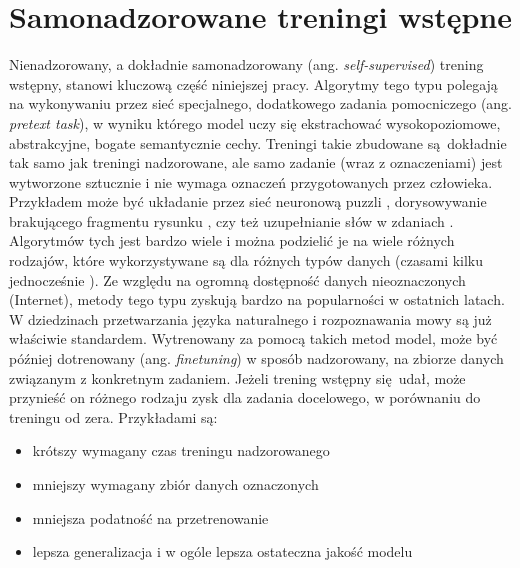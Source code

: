\section{Samonadzorowane treningi wstępne}

Nienadzorowany, a dokładnie samonadzorowany (ang. \emph{self-supervised}) trening wstępny, stanowi
kluczową część niniejszej pracy. Algorytmy tego typu polegają na wykonywaniu przez sieć specjalnego,
dodatkowego zadania pomocniczego (ang. \emph{pretext task}), w wyniku którego model uczy się
ekstrachować wysokopoziomowe, abstrakcyjne, bogate semantycznie cechy. Treningi takie zbudowane
są dokładnie tak samo jak treningi nadzorowane, ale samo zadanie (wraz z oznaczeniami) jest
wytworzone sztucznie i nie wymaga oznaczeń przygotowanych przez człowieka. Przykładem może być
układanie przez sieć neuronową puzzli \cite{noroozi_unsupervised_2017}, dorysowywanie brakującego
fragmentu rysunku \cite{pathak_context_2016}, czy też uzupełnianie słów w zdaniach
\cite{devlin_bert_2019}. Algorytmów tych jest bardzo wiele i można podzielić je na wiele różnych
rodzajów, które wykorzystywane są dla różnych typów danych (czasami kilku jednocześnie
\cite{jia_scaling_2021}). Ze względu na ogromną dostępność danych nieoznaczonych (Internet), metody
tego typu zyskują bardzo na popularności w ostatnich latach. W dziedzinach przetwarzania języka
naturalnego i rozpoznawania mowy są już właściwie standardem. Wytrenowany za pomocą takich metod
model, może być później dotrenowany (ang. \emph{finetuning}) w sposób nadzorowany, na zbiorze
danych związanym z konkretnym zadaniem. Jeżeli trening wstępny się udał, może przynieść on różnego
rodzaju zysk dla zadania docelowego, w porównaniu do treningu od zera. Przykładami są:
\begin{itemize}
    \item krótszy wymagany czas treningu nadzorowanego
    \item mniejszy wymagany zbiór danych oznaczonych
    \item mniejsza podatność na przetrenowanie
    \item lepsza generalizacja i w ogóle lepsza ostateczna jakość modelu
\end{itemize}

